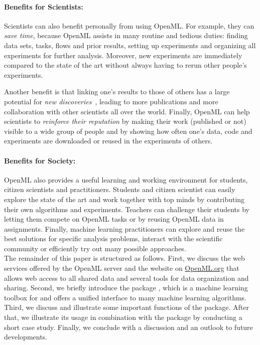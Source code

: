 \paragraph{Benefits for Scientists:}
Scientists can also benefit personally from using Open\-ML. For example, they can 
\textit{save time}, because OpenML assists in many routine and tedious duties:
finding data sets, tasks, flows and prior results, setting up experiments
and organizing all experiments for further analysis. Moreover, new experiments
are immediately compared to the state of the art without always having to rerun
other people's experiments.

Another benefit is that linking one's results to those of others has a large potential for
\textit{new discoveries}~, leading to more publications and more collaboration with
other scientists all over the world.
Finally, OpenML can help scientists to \textit{reinforce their reputation} by making their
work (published or not) visible to a wide group of people and by showing
how often one's data, code and experiments are downloaded or reused in the
experiments of others.

\paragraph{Benefits for Society:}
OpenML also provides a useful learning and working environment for students, citizen
scientists and practitioners. Students and citizen scientist can easily
explore the state of the art and work together with top minds by contributing
their own algorithms and experiments. Teachers can challenge their students by
letting them compete on OpenML tasks or by reusing OpenML data in
assignments. Finally, machine learning practitioners can explore and reuse the
best solutions for specific analysis problems, interact with the scientific
community or efficiently try out many possible approaches. \\

\noindent The remainder of this paper is structured as follows. First, we discuss the web
services offered by the OpenML server and the website on \href{http://openml.org}{OpenML.org} that allows
web access to all shared data and several tools for data organization and
sharing. Second, we briefly introduce the  package \citep{JMLR:v17:15-066, schiffner2016mlr}, which is a machine 
learning toolbox for  \citep{r2016} and offers a unified interface to many machine learning algorithms.
Third, we discuss and illustrate some important functions of the 
package. After that, we illustrate its usage in combination with
the  package by conducting a short case study. Finally, we conclude
with a discussion and an outlook to future developments.



